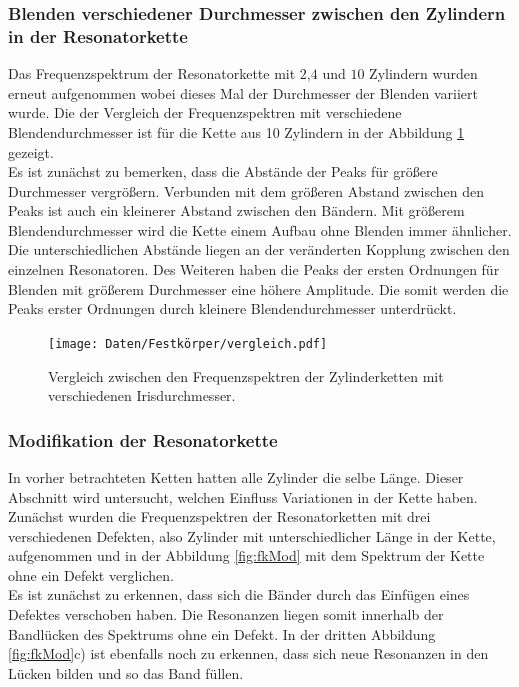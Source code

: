 \subsubsection{Blenden verschiedener Durchmesser zwischen den Zylindern in der Resonatorkette}

Das Frequenzspektrum der Resonatorkette mit $2$,$4$ und $10$ Zylindern wurden erneut aufgenommen wobei dieses Mal der Durchmesser der Blenden variiert wurde. 
Die der Vergleich der Frequenzspektren mit verschiedene Blendendurchmesser ist für die Kette aus 10 Zylindern in der Abbildung \ref{fig:fkvergleich} gezeigt. \\
Es ist zunächst zu bemerken, dass die Abstände der Peaks für größere Durchmesser vergrößern. Verbunden mit dem größeren Abstand zwischen den Peaks ist auch ein kleinerer Abstand zwischen den Bändern. Mit größerem Blendendurchmesser wird die Kette einem Aufbau ohne Blenden immer ähnlicher. 
Die unterschiedlichen Abstände liegen an der veränderten Kopplung zwischen den einzelnen Resonatoren. 
Des Weiteren haben die Peaks der ersten Ordnungen für Blenden mit größerem Durchmesser eine höhere Amplitude. Die somit werden die Peaks erster Ordnungen durch kleinere Blendendurchmesser unterdrückt. 

\begin{figure}[H]
  \centering
  \texttt{[image: Daten/Festkörper/vergleich.pdf]}
  \caption{Vergleich zwischen den Frequenzspektren der Zylinderketten mit verschiedenen Irisdurchmesser.}
  \label{fig:fkvergleich}
\end{figure}
\subsubsection{Modifikation der Resonatorkette}

In vorher betrachteten Ketten hatten alle Zylinder die selbe Länge. 
Dieser Abschnitt wird untersucht, welchen Einfluss Variationen in der Kette haben. \\
Zunächst wurden die Frequenzspektren der Resonatorketten mit drei verschiedenen Defekten, also Zylinder mit unterschiedlicher Länge in der Kette, aufgenommen und in der Abbildung \ref{fig:fkMod} mit dem Spektrum der Kette ohne ein Defekt verglichen. \\
Es ist zunächst zu erkennen, dass sich die Bänder durch das Einfügen eines Defektes verschoben haben. Die Resonanzen liegen somit innerhalb der Bandlücken des Spektrums ohne ein Defekt. In der dritten Abbildung \ref{fig:fkMod}c) ist ebenfalls noch zu erkennen, dass sich neue Resonanzen in den Lücken bilden und so das Band füllen. 


